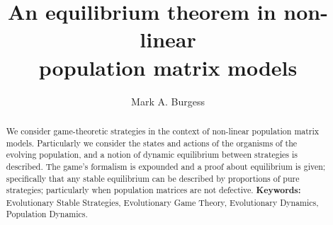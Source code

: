 \documentclass{GTM2020}
\begin{document}
\title{An equilibrium theorem in non-linear \\ population matrix models}
\author{Mark A. Burgess}

\maketitle

\begin{abstract}
We consider game-theoretic strategies in the context of non-linear population matrix models. 
Particularly we consider the states and actions of the organisms of the evolving population, and a notion of dynamic equilibrium between strategies is described. 
The game's formalism is expounded and a proof about equilibrium is given; specifically that any stable equilibrium can be described by proportions of pure strategies; 
particularly when population matrices are not defective.
\vskip3pt
{\bf Keywords:} Evolutionary Stable Strategies, Evolutionary Game Theory, Evolutionary Dynamics, Population Dynamics.
\end{abstract}



%
%
%

%
%
\end{document}
